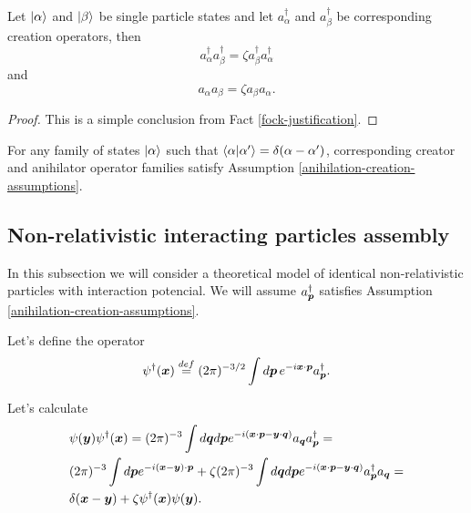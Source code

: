 \documentclass[main.tex]{subfiles}
\begin{document}
\begin{proposition}
Let $\ket{\alpha}$ and $\ket{\beta}$ be single particle states and let $a^\dagger_{\alpha}$ and $a^\dagger_{\beta}$ be corresponding creation operators, then
\begin{equation}
a^\dagger_\alpha a^\dagger_\beta = \zeta  a^\dagger_\beta a^\dagger_\alpha
\end{equation}
and
\begin{equation}
a_\alpha a_\beta = \zeta  a_\beta a_\alpha.
\end{equation}
\end{proposition}
\begin{proof}
This is a simple conclusion from Fact \ref{fock-justification}.
\end{proof}
\begin{corollary}
For any family of states $\ket{\alpha}$ such that $\bra{\alpha}\ket{\alpha'} = \delta(\alpha - \alpha')$, corresponding creator and anihilator operator families satisfy Assumption \ref{anihilation-creation-assumptions}. 
\end{corollary}

\subsection{Non-relativistic interacting particles assembly}

In this subsection we will consider a theoretical model of identical non-relativistic particles with interaction potencial. We will assume $a^\dagger_{\boldsymbol{p}}$ satisfies Assumption \ref{anihilation-creation-assumptions}.

Let's define the operator
\begin{equation}
\psi^\dagger(\boldsymbol{x}) \stackrel{def}{=} (2\pi)^{-3/2}\int d\boldsymbol{p}\, e^{-i\boldsymbol{x}\cdot \boldsymbol{p}} a^\dagger_{\boldsymbol{p}}.
\end{equation}

Let's calculate
\begin{align*}
&\psi(\boldsymbol{y})\psi^\dagger(\boldsymbol{x}) = (2\pi)^{-3} \int d\boldsymbol{q}d\boldsymbol{p} e^{-i(\boldsymbol{x}\cdot \boldsymbol{p} - \boldsymbol{y}\cdot \boldsymbol{q})} a_{\boldsymbol{q}} a^\dagger_{\boldsymbol{p}} = \\
& (2\pi)^{-3} \int d\boldsymbol{p} e^{-i(\boldsymbol{x} - \boldsymbol{y})\cdot \boldsymbol{p}} + \zeta (2\pi)^{-3} \int d\boldsymbol{q}d\boldsymbol{p} e^{-i(\boldsymbol{x}\cdot \boldsymbol{p} - \boldsymbol{y}\cdot \boldsymbol{q})} a^\dagger_{\boldsymbol{p}} a_{\boldsymbol{q}}  = \\
& \delta(\boldsymbol{x} - \boldsymbol{y}) + \zeta \psi^\dagger(\boldsymbol{x}) \psi(\boldsymbol{y}).
\end{align*}
\end{document}
